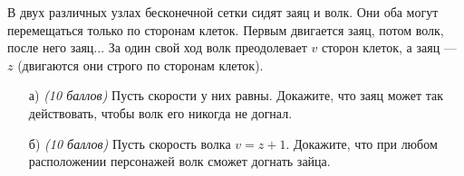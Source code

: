 
В двух различных узлах бесконечной сетки сидят заяц и волк. 
	Они оба могут
	перемещаться только по сторонам клеток. Первым двигается заяц,
	потом волк, после него заяц... За один свой ход волк 
	преодолевает $v$ сторон клеток, а заяц --- $z$ 
	(двигаются они строго по сторонам клеток).
    
    \begin{enumerate}
    	\item[а)] \textit{(10 баллов)} Пусть скорости у них равны. 
	Докажите, что заяц может так
	действовать, чтобы волк его никогда не догнал. 
        \item[б)] \textit{(10 баллов)} Пусть скорость волка $v = z+1$.	
	Докажите, что при любом расположении персонажей 
    волк сможет догнать зайца.
\end{enumerate}